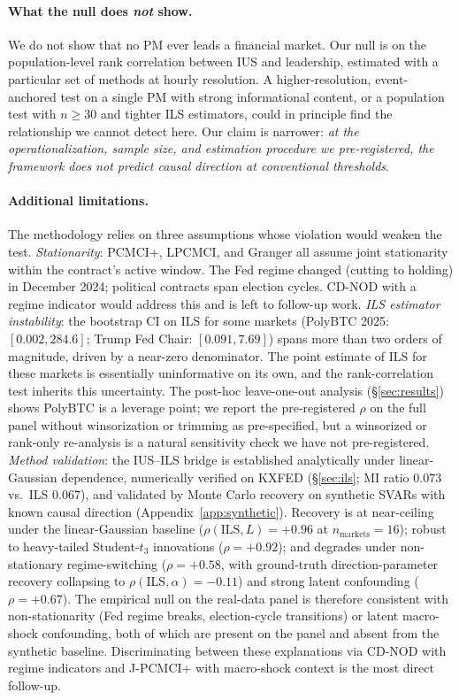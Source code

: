 \documentclass{article}
\begin{document}
\paragraph{What the null does \emph{not} show.}
We do not show that no PM ever leads a financial market. Our null is on the population-level rank correlation between IUS and leadership, estimated with a particular set of methods at hourly resolution. A higher-resolution, event-anchored test on a single PM with strong informational content, or a population test with $n \ge 30$ and tighter ILS estimators, could in principle find the relationship we cannot detect here. Our claim is narrower: \emph{at the operationalization, sample size, and estimation procedure we pre-registered, the framework does not predict causal direction at conventional thresholds}.

\paragraph{Additional limitations.}
The methodology relies on three assumptions whose violation would weaken the test. \emph{Stationarity}: PCMCI+, LPCMCI, and Granger all assume joint stationarity within the contract's active window. The Fed regime changed (cutting to holding) in December 2024; political contracts span election cycles. CD-NOD with a regime indicator \citep{huang2020causal} would address this and is left to follow-up work. \emph{ILS estimator instability}: the bootstrap CI on $\mathrm{ILS}$ for some markets (PolyBTC 2025: $[0.002, 284.6]$; Trump Fed Chair: $[0.091, 7.69]$) spans more than two orders of magnitude, driven by a near-zero denominator. The point estimate of $\mathrm{ILS}$ for these markets is essentially uninformative on its own, and the rank-correlation test inherits this uncertainty. The post-hoc leave-one-out analysis (\S\ref{sec:results}) shows PolyBTC is a leverage point; we report the pre-registered $\rho$ on the full panel without winsorization or trimming as pre-specified, but a winsorized or rank-only re-analysis is a natural sensitivity check we have not pre-registered. \emph{Method validation}: the IUS--ILS bridge is established analytically under linear-Gaussian dependence, numerically verified on KXFED (\S\ref{sec:ils}; MI ratio $0.073$ vs.\ ILS $0.067$), and validated by Monte Carlo recovery on synthetic SVARs with known causal direction (Appendix~\ref{app:synthetic}). Recovery is at near-ceiling under the linear-Gaussian baseline ($\rho(\mathrm{ILS}, L) = +0.96$ at $n_\text{markets} = 16$); robust to heavy-tailed Student-$t_3$ innovations ($\rho = +0.92$); and degrades under non-stationary regime-switching ($\rho = +0.58$, with ground-truth direction-parameter recovery collapsing to $\rho(\mathrm{ILS}, \alpha) = -0.11$) and strong latent confounding ($\rho = +0.67$). The empirical null on the real-data panel is therefore consistent with non-stationarity (Fed regime breaks, election-cycle transitions) or latent macro-shock confounding, both of which are present on the panel and absent from the synthetic baseline. Discriminating between these explanations via CD-NOD with regime indicators \citep{huang2020causal} and J-PCMCI+ with macro-shock context is the most direct follow-up.
\end{document}
